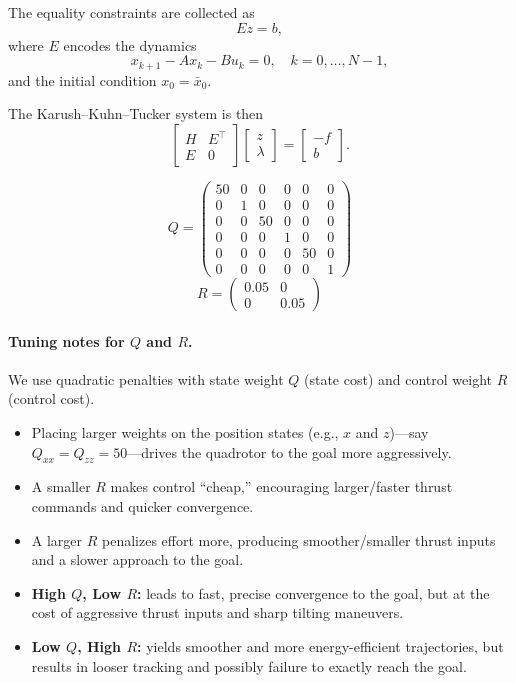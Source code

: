 \documentclass{article}
\begin{document}
The equality constraints are collected as
\[
E z = b,
\]
where $E$ encodes the dynamics
\[
x_{k+1} - A x_k - B u_k = 0, \quad k=0,\dots,N-1,
\]
and the initial condition $x_0 = \bar{x}_0$.

The Karush–Kuhn–Tucker system is then
\[
\begin{bmatrix}
H & E^\top \\[1ex]
E & 0
\end{bmatrix}
\begin{bmatrix}
z \\[1ex] \lambda
\end{bmatrix}
=
\begin{bmatrix}
- f \\[1ex] b
\end{bmatrix}.
\]

\[
Q=\begin{pmatrix}
    50&0&0&0&0&0\\
    0&1&0&0&0&0\\
    0&0&50&0&0&0\\
    0&0&0&1&0&0\\
    0&0&0&0&50&0\\
    0&0&0&0&0&1
\end{pmatrix}
\]
\[
R=\begin{pmatrix}
    0.05 &0\\
    0&0.05
\end{pmatrix}
\]
\paragraph*{Tuning notes for $Q$ and $R$.}
We use quadratic penalties with state weight $Q$ (state cost) and control weight $R$ (control cost).
\begin{itemize}
  \item Placing larger weights on the position states (e.g., \(x\) and \(z\))—say \(Q_{xx}=Q_{zz}=50\)—drives the quadrotor to the goal more aggressively.
  \item A smaller \(R\) makes control ``cheap,'' encouraging larger/faster thrust commands and quicker convergence.
  \item A larger \(R\) penalizes effort more, producing smoother/smaller thrust inputs and a slower approach to the goal.
  \item \textbf{High $Q$, Low $R$:} leads to fast, precise convergence to the goal, but at the cost of aggressive thrust inputs and sharp tilting maneuvers.
  \item \textbf{Low $Q$, High $R$:} yields smoother and more energy-efficient trajectories, but results in looser tracking and possibly failure to exactly reach the goal.
\end{itemize}
\end{document}

